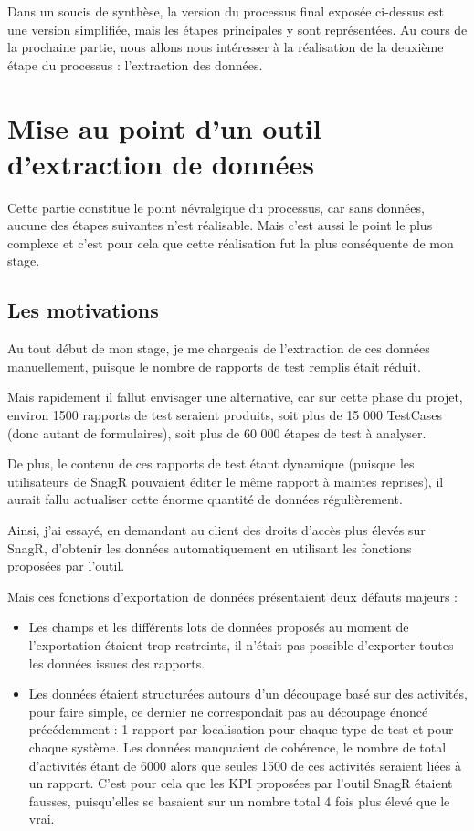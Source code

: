 Dans un soucis de synthèse, la version du processus final exposée ci-dessus est une version simplifiée, mais les étapes principales y sont représentées. 
Au cours de la prochaine partie, nous allons nous intéresser à la réalisation de la deuxième étape du processus : l'extraction des données. 

\newpage
\section{Mise au point d'un outil d'extraction de données }
Cette partie constitue le point névralgique du processus, car sans données, aucune des étapes suivantes n'est réalisable. Mais c'est aussi le point le plus complexe et c'est pour cela que cette réalisation fut la plus conséquente de mon stage.
\subsection{Les motivations}
Au tout début de mon stage, je me chargeais de l'extraction de ces données manuellement, puisque le nombre de rapports de test remplis était réduit. 

Mais rapidement il fallut envisager une alternative, car sur cette phase du projet, environ 1500 rapports de test seraient produits, soit plus de 15 000 \gls{TestCases} (donc autant de formulaires), soit plus de 60 000 étapes de test à analyser.

De plus, le contenu de ces rapports de test étant dynamique (puisque les utilisateurs de \gls{SnagR} pouvaient éditer le même rapport à maintes reprises), il aurait fallu actualiser cette énorme quantité de données régulièrement. 

Ainsi, j'ai essayé, en demandant au client des droits d'accès plus élevés sur \gls{SnagR}, d'obtenir les données automatiquement en utilisant les fonctions proposées par l'outil.

Mais ces fonctions d'exportation de données présentaient deux défauts majeurs :
\begin{itemize}
\item Les champs et les différents lots de données proposés au moment de l'exportation étaient trop restreints, il n'était pas possible d'exporter toutes les données issues des rapports.
\item Les données étaient structurées autours d'un découpage basé sur des activités, pour faire simple, ce dernier ne correspondait pas au découpage énoncé précédemment : 1 rapport par localisation pour chaque type de test et pour chaque système. Les données manquaient de cohérence, le nombre de total d'activités étant de 6000 alors que seules 1500 de ces activités seraient liées à un rapport. C'est pour cela que les \gls{KPI} proposées par l'outil \gls{SnagR} étaient fausses, puisqu'elles se basaient sur un nombre total 4 fois plus élevé que le vrai.
\end{itemize}

